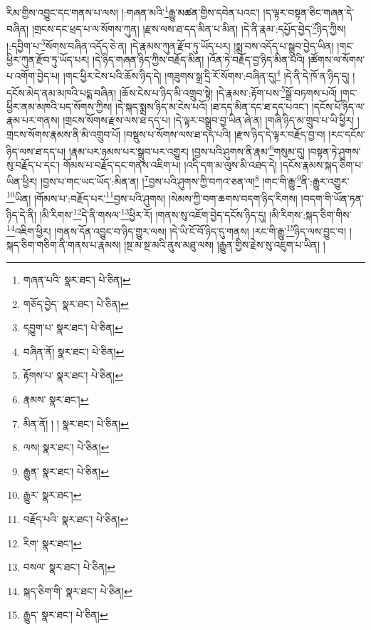 རིམ་གྱིས་འབྱུང་དང་གནས་པ་ལས། །:གཞན་མའི་\footnote{གཞན་པའི་  སྣར་ཐང་།  པེ་ཅིན། }རྒྱུ་མཚན་གྱིས་དབེན་པའང་། །ད་ལྟར་བསྟན་ཅིང་གཞན་དེ་བཞིན། །གྲངས་དང་ཕྲད་པ་ལ་སོགས་ཀུན། །རྫས་ལས་ཐ་དད་མིན་པ་མིན། །དེ་ནི་རྣམ་:དཔྱོད་བྱེད་\footnote{གཅོད་བྱེད་  སྣར་ཐང་།  པེ་ཅིན། }ཉིད་ཀྱིས། །:དབྱིག་པ་\footnote{དབྱུག་པ་  སྣར་ཐང་།  པེ་ཅིན། }སོགས་བཞིན་འདོད་ཅེ་ན། །དེ་རྣམས་ཀུན་རྫོབ་ཏུ་ཡོད་པར། །སྨྲ་བས་འདོད་པ་སྒྲུབ་བྱེད་ཡིན། །གང་ཕྱིར་ཀུན་རྫོབ་ཏུ་ཡོད་པར། །དེ་ཉིད་གཞན་ཉིད་ཀྱིས་བརྗོད་མིན། །འོན་ཏེ་བརྗོད་བྱ་ཉིད་མིན་པའི། །ཚོགས་ལ་སོགས་པ་འགོག་བྱེད་པ། །གང་ཕྱིར་ངེས་པའི་ཆོས་ཉིད་དེ། །གཟུགས་སྒྲ་དྲི་རོ་སོགས་:བཞིན་དུ།\footnote{བཞིན་ནོ།  སྣར་ཐང་།  པེ་ཅིན། } །དེ་ནི་དེ་ཁོ་ན་ཉིད་དུ། །དངོས་མེད་ནམ་མཁའི་པདྨ་བཞིན། །ཆོས་ངེས་པ་ཉིད་མི་འགྲུབ་སྟེ། །དེ་རྣམས་:རྟོག་པས་\footnote{རྟོགས་པ་  སྣར་ཐང་།  པེ་ཅིན། }སྒྲོ་བཏགས་པའོ། །གང་ཕྱིར་ནམ་མཁའི་པད་སོགས་ཀྱིས། །དེ་སྐད་སྨྲས་ཉིད་མ་ངེས་པའོ། །ཐ་དད་མིན་དང་ཐ་དད་པའང་། །དངོས་པོ་ཉིད་ལ་རྣམ་པར་གནས། །གྲངས་སོགས་རྫས་ལས་ཐ་དད་པ། །དེ་ལྟར་བསྒྲུབ་བྱ་ཡིན་ཞེ་ན། །གཞི་ཉིད་མ་གྲུབ་པ་ཡི་ཕྱིར། །གྲངས་སོགས་རྣམས་ནི་མི་འགྲུབ་པོ། །བསྡུས་པ་སོགས་ལས་ཐ་དད་པའི། །རྫས་ཉིད་དེ་ལྟར་བརྗོད་བྱ་བ། །རང་དངོས་ཉིད་ལས་ཐ་དད་པ། །རྣམ་པར་ཉམས་པར་སྒྲུབ་པར་འགྱུར། །བྱས་པའི་ཤུགས་ནི་རྣམ་\footnote{རྣམས་  སྣར་ཐང་། }གསུམ་དུ། །བསྟན་ཏེ་ཤུགས་སུ་བརྗོད་པ་དང་། གོམས་པ་བརྗོད་དང་གནས་འཇིག་པ། །འདི་དག་མ་ལུས་མི་འཐད་དེ། །དངོས་རྣམས་སྐད་ཅིག་པ་ཡིན་ཕྱིར། །བྱས་པ་གང་ཡང་ཡོད་:མིན་ན། །\footnote{མིན་ནོ། ། །  སྣར་ཐང་།  པེ་ཅིན། }བྱས་པའི་ཤུགས་ཀྱི་བཀའ་ཅན་ལ།\footnote{ལས།  སྣར་ཐང་།  པེ་ཅིན། } །གང་གི་རྒྱུ་\footnote{རྒྱུན་  སྣར་ཐང་།  པེ་ཅིན། }ནི་:རྒྱུར་འགྱུར་\footnote{རྒྱུར་  སྣར་ཐང་། }ཡིན། །གོམས་པ་:བརྗོད་པར་\footnote{བརྗོད་པའི་  སྣར་ཐང་།  པེ་ཅིན། }བྱས་པའི་ཤུགས། །སེམས་ཀྱི་བག་ཆགས་བདག་ཉིད་རིགས། །བདག་གི་ཡོན་ཏན་ཉིད་དེ་ནི། །མི་རིགས་\footnote{རིག་  སྣར་ཐང་། }དེ་ནི་གསལ་\footnote{བསལ་  སྣར་ཐང་།  པེ་ཅིན། }ཕྱིར་རོ། །གནས་སུ་འཇོག་བྱེད་དངོས་ཉིད་དུ། །མི་རིགས་:སྐད་ཅིག་གིས་\footnote{སྐད་ཅིག་གི་  སྣར་ཐང་།  པེ་ཅིན། }འཇིག་ཕྱིར། །གནས་དོན་འབྱུང་བ་ཉིད་གྱུར་ལས། །དེ་ཡི་ངོ་བོ་ཉིད་དུ་གནས། །རང་གི་རྒྱུ་\footnote{རྒྱུད་  སྣར་ཐང་།  པེ་ཅིན། }ཉིད་ལས་བྱུང་བ། །སྐད་ཅིག་གཅིག་ནི་གནས་པ་རྣམས། །སྔ་མ་སྔ་མའི་ནུས་མཐུ་ལས། །རྒྱུན་གྱིས་རྗེས་སུ་འཇུག་པ་ཡིན། །
